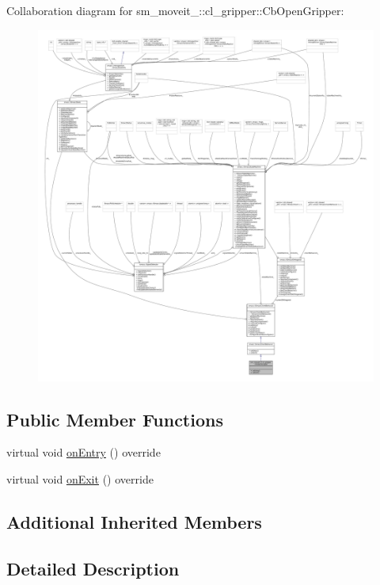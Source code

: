 Collaboration diagram for sm\+\_\+moveit\+\_\+:\+:cl\+\_\+gripper\+:\+:Cb\+Open\+Gripper\+:
\nopagebreak
\begin{figure}[H]
\begin{center}
\leavevmode
\includegraphics[width=350pt]{classsm__moveit__2_1_1cl__gripper_1_1CbOpenGripper__coll__graph}
\end{center}
\end{figure}
\subsection*{Public Member Functions}
\begin{DoxyCompactItemize}
\item 
virtual void \hyperlink{classsm__moveit__2_1_1cl__gripper_1_1CbOpenGripper_aaa18f60580c10e891b572f61f85ffb05}{on\+Entry} () override
\item 
virtual void \hyperlink{classsm__moveit__2_1_1cl__gripper_1_1CbOpenGripper_ab72fa9429628aa78b2bb1276ff7d390a}{on\+Exit} () override
\end{DoxyCompactItemize}
\subsection*{Additional Inherited Members}


\subsection{Detailed Description}


